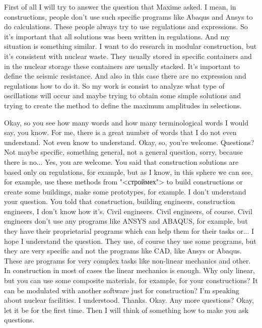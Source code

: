 \documentclass[main.tex]{subfiles}
\begin{document}
First of all I will try to answer the question that Maxime asked.
I mean, in constructions, people don't use such specific programs like Abaqus and Ansys to do calculations.
These people always try to use regulations and expressions.
So it's important that all solutions was been written in regulations.
And my situation is something similar.
I want to do research in modular construction, but it's consistent with nuclear waste.
They usually stored in specific containers and in the nuclear storage these containers are usually stacked.
It's important to define the seismic resistance.
And also in this case there are no expression and regulations how to do it.
So my work is consist to analyze what type of oscillations will occur and maybe trying to obtain some simple solutions and trying to create the method to define the maximum amplitudes in selections.

Okay, so you see how many words and how many terminological words I would say, you know.
For me, there is a great number of words that I do not even understand.
Not even know to understand.
Okay, so, you're welcome.
Questions? Not maybe specific, something general, not a general question, sorry, because there is no...
Yes, you are welcome.
You said that construction solutions are based only on regulations, for example, but as I know, in this sphere we can see, for example, use these methods from "<строймех"> to build constructions or create some buildings, make some prototypes, for example.
I don't understand your question.
You told that construction, building engineers, construction engineers, I don't know how it's.
Civil engineers.
Civil engineers, of course.
Civil engineers don't use any programs like ANSYS and ABAQUS, for example, but they have their proprietarial programs which can help them for their tasks or...
I hope I understand the question.
They use, of course they use some programs, but they are very specific and not the programs like CAD, like Ansys or Abaqus.
These are programs for very complex tasks like non-linear mechanics and other.
In construction in most of cases the linear mechanics is enough.
Why only linear, but you can use some composite materials, for example, for your constructions?
It can be modulated with another software just for construction?
I'm speaking about nuclear facilities.
I understood.
Thanks.
Okay.
Any more questions?
Okay, let it be for the first time.
Then I will think of something how to make you ask questions.

\newpage
{}
\end{document}
